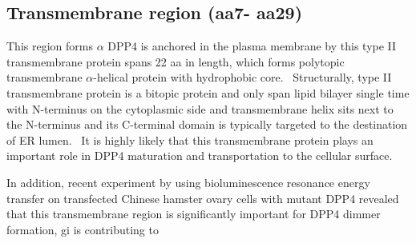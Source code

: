 \subsection{Transmembrane region (aa7- aa29)}

This region forms $\alpha$
DPP4 is anchored in the plasma membrane by this type II transmembrane protein spans 22 aa in length, which forms polytopic transmembrane $\alpha$-helical protein with hydrophobic core.~\cite{Hong_1990} Structurally, type II transmembrane protein is a bitopic protein and only span lipid bilayer single time with N-terminus on the cytoplasmic side and transmembrane helix sits next to the N-terminus and its C-terminal domain is typically targeted to the destination of ER lumen.~\cite{Luckey} It is highly likely that this transmembrane protein plays an important role in DPP4 maturation and transportation to the cellular surface. 
\par 
In addition, recent experiment by \citet{Chung_2010} using bioluminescence resonance energy transfer on transfected Chinese hamster ovary cells with mutant DPP4 revealed that this transmembrane region is significantly important for DPP4 dimmer formation, gi is contributing to  
